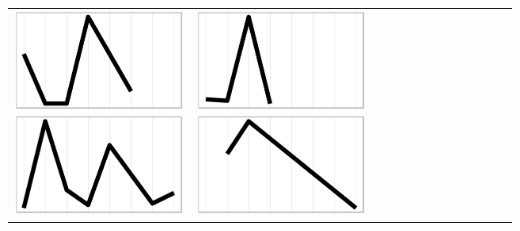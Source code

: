 \documentclass[10pt, conference, compsocconf]{IEEEtran}
\begin{document}
\begin{table}
\begin{tabular}{ | b{1.5cm} | c | c | c | c | c | c | c | c | c | c | c |}
 \includegraphics[scale=0.08]{figures/bbba.ps} &  
 \includegraphics[scale=0.08]{figures/bcaa.ps} &  

\end{tabular}
\end{table}
\end{document}
